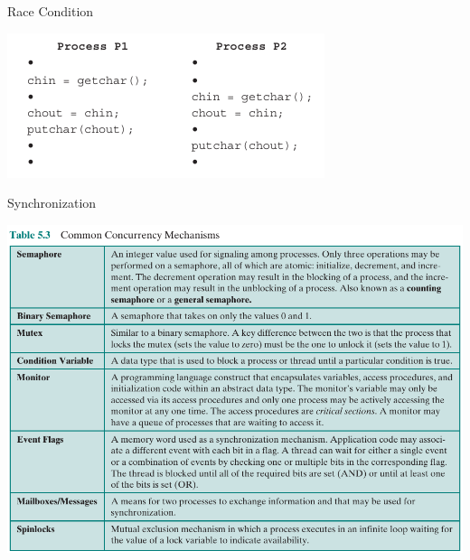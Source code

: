 \documentclass[10pt]{beamer}
\begin{document}
\begin{frame}{Race Condition}
   \begin{center}
      \includegraphics[keepaspectratio, width=\textwidth, height=\textheight-2\baselineskip-2\baselineskip]{img/021_race_cond.png} \\
 \end{center}
\end{frame}

\begin{frame}{Synchronization}
    \begin{center}
      \includegraphics[keepaspectratio, width=\textwidth, height=\textheight-2\baselineskip-2\baselineskip]{img/022_locks.png} \\
 \end{center}
\end{frame}
\end{document}
